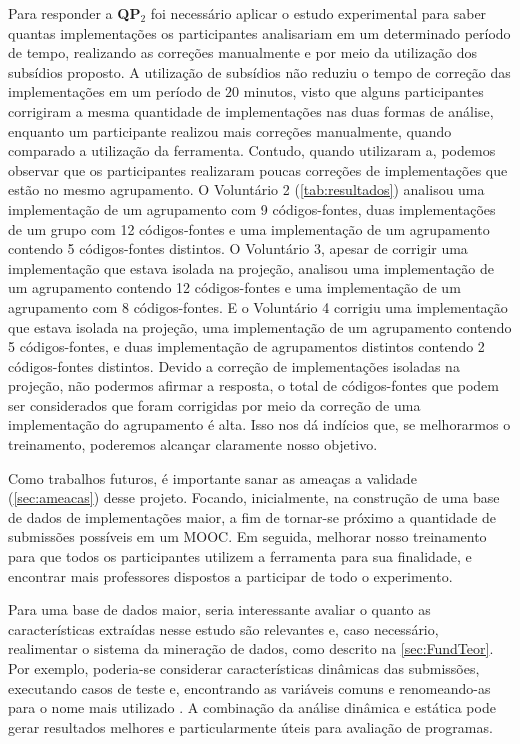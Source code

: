 	Para responder a \textbf{QP$_2$} foi necessário aplicar o estudo experimental
	para saber quantas implementações os participantes analisariam em um determinado
	período de tempo, realizando as correções manualmente e por meio da utilização dos
	subsídios proposto. A utilização de subsídios não reduziu o tempo de correção
	das implementações em um período de $20$ minutos, visto que alguns participantes
	corrigiram a mesma quantidade de implementações nas duas formas de análise, enquanto
	um participante realizou mais correções manualmente, quando comparado a utilização
	da ferramenta. Contudo, quando utilizaram a, podemos observar
	que os participantes realizaram poucas correções de implementações que estão no
	mesmo agrupamento. O Voluntário 2 (\cref{tab:resultados}) analisou uma implementação
	de um agrupamento com 9 códigos-fontes, duas implementações de um grupo com 12
	códigos-fontes e uma implementação de um agrupamento contendo 5 códigos-fontes
	distintos. O Voluntário 3, apesar de corrigir uma implementação que estava isolada
	na projeção, analisou uma implementação de um agrupamento contendo 12 códigos-fontes
	e uma implementação de um agrupamento com 8 códigos-fontes. E o Voluntário 4
	corrigiu uma implementação que estava isolada na projeção, uma implementação de
	um agrupamento contendo 5 códigos-fontes, e duas implementação de agrupamentos
	distintos contendo 2 códigos-fontes distintos. Devido a correção de implementações
	isoladas na projeção, não podermos afirmar a resposta, o total de códigos-fontes
	que podem ser considerados que foram corrigidas por meio da correção de uma
	implementação do agrupamento é alta. Isso nos dá indícios que, se melhorarmos
	o treinamento, poderemos alcançar claramente nosso objetivo.
	
	
	Como trabalhos futuros, é importante sanar as ameaças a validade (\cref{sec:ameacas})
	desse projeto. Focando, inicialmente, na construção de uma base de dados de
	implementações maior, a fim de tornar-se próximo a quantidade de submissões
	possíveis em um \acs{MOOC}. Em seguida, melhorar nosso treinamento para que
	todos os participantes utilizem a ferramenta para sua finalidade, e encontrar
	mais professores dispostos a participar de todo o experimento.
	
	Para uma base de dados maior, seria interessante avaliar o quanto as características
	extraídas nesse estudo são relevantes e, caso necessário, realimentar o
	sistema da mineração de dados, como descrito na \cref{sec:FundTeor}. Por
	exemplo, poderia-se considerar características dinâmicas das submissões, executando
	casos de teste e, encontrando as variáveis
	comuns e renomeando-as para o nome mais utilizado \cite{Glassman:2015}.
	A combinação da análise dinâmica e estática pode gerar resultados melhores e
	particularmente úteis para avaliação de programas.
